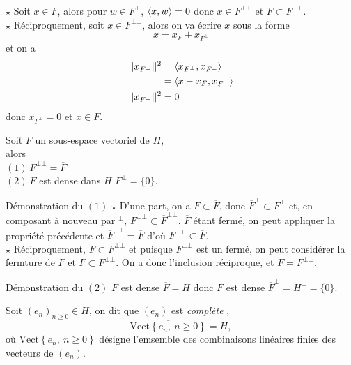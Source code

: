 \documentclass[a4paper,11pt, twoside]{article}
\begin{document}
\begin{Proof}
  $\star$ Soit $x\in F$, alors pour $w\in F^\bot$, $\left\langle x,w \right\rangle=0$ donc $x\in F^{\bot\bot}$ et $F\subset F^{\bot\bot}$.\\

  $\star$ Réciproquement, soit $x\in F^{\bot\bot}$, alors on va écrire $x$ sous la forme 
  $$x=x_F+x_{F^\bot}$$
  et on a 
  \begin{align*}
    ||x_{F^\bot}||^2&=\left\langle x_{F^\bot},x_{F^\bot} \right\rangle\\
    &=\left\langle x-x_F,x_{F^\bot} \right\rangle\\
    ||x_{F^\bot}||^2&=0
  \end{align*}
  donc $x_{F^\bot}=0$ et $x\in F$.
\end{Proof}


\begin{prop}
  Soit $F$ un sous-espace vectoriel de $H$, \\

  alors\\
  $(\mathit 1)\ F^{\bot\bot}=\overline{F}$\\
  $(\mathit 2)\ F$ est dense dans $H$ \ssi $F^\bot=\{0\}.$
\end{prop}


\begin{ProofC}{Démonstration du $(\mathit 1)$}
  $\star$ D'une part, on a $F\subset \overline{F}$, donc $\overline{F}^\bot\subset F^\bot$ et, en composant à nouveau par $^\bot$, $F^{\bot\bot}\subset \overline{F}^{\bot\bot}$. $\overline{F}$ étant fermé, on peut appliquer la propriété précédente et $\overline{F}^{\bot\bot}=\overline{F}$ d'où $F^{\bot\bot}\subset\overline{F}$.\\

  $\star$ Réciproquement, $F\subset F^{\bot\bot}$ et puisque $F^{\bot\bot}$ est un fermé, on peut considérer la fermture de $F$ et $\overline{F}\subset F^{\bot\bot}$. On a donc l'inclusion réciproque, et $\overline{F}= F^{\bot\bot}$.
\end{ProofC}



\begin{ProofC}{Démonstration du $(\mathit 2)$}
  $F$ est dense \ssi $\overline{F}=H$ donc $F$ est dense \ssi $\overline{F}^\bot=H^\bot=\{0\}.$
\end{ProofC}





\begin{Def}
  Soit $(e_n)_{n\geqslant 0}\in H$, on dit que $(e_n)$ est \emph{complète} \ssi,\\
  $$\overline{\mathrm{Vect}\left\{e_n,\ n\geqslant 0\right\}}=H,$$
  où $\mathrm{Vect}\left\{e_n,\ n\geqslant 0\right\}$ désigne l'emsemble des combinaisons linéaires finies des vecteurs de $(e_n)$.
\end{Def}
\end{document}
